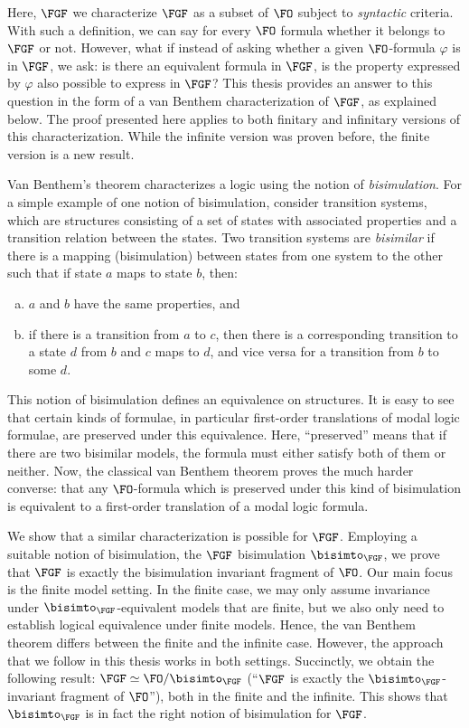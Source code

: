 Here, $\FGF$ we characterize $\FGF$ as a subset of $\FO$ subject to \emph{syntactic} criteria.
With such a definition, we can say for every $\FO$ formula whether it belongs to $\FGF$ or not.
However, what if instead of asking whether a given $\FO$-formula $\varphi$ is in $\FGF$, we ask: is there an equivalent formula in $\FGF$, \ie is the property expressed by $\varphi$ also possible to express in $\FGF$?
This thesis provides an answer to this question in the form of a van Benthem characterization of $\FGF$, as explained below.
The proof presented here applies to both finitary and infinitary versions of this characterization.
While the infinite version was proven before, the finite version is a new result.

Van Benthem's theorem characterizes a logic using the notion of \emph{bisimulation}.
For a simple example of one notion of bisimulation, consider transition systems, which are structures consisting of a set of states with associated properties and a transition relation between the states.
Two transition systems are \emph{bisimilar} if there is a mapping (bisimulation) between states from one system to the other such that if state $a$ maps to state $b$, then:
\begin{enumerate}[(a)]
  \item $a$ and $b$ have the same properties, and
  \item if there is a transition from $a$ to $c$, then there is a corresponding transition to a state $d$ from $b$ and $c$ maps to $d$, and vice versa for a transition from $b$ to some $d$.
\end{enumerate}
This notion of bisimulation defines an equivalence on structures.
It is easy to see that certain kinds of formulae, in particular first-order translations of modal logic formulae, are preserved under this equivalence.
Here, ``preserved'' means that if there are two bisimilar models, the formula must either satisfy both of them or neither.
Now, the classical van Benthem theorem\cite{van1983modal} proves the much harder converse: that any $\FO$-formula which is preserved under this kind of bisimulation is equivalent to a first-order translation of a modal logic formula.

We show that a similar characterization is possible for $\FGF$.
Employing a suitable notion of bisimulation, the $\FGF$ bisimulation $\bisimto_{\FGF}$, we prove that $\FGF$ is exactly the bisimulation invariant fragment of $\FO$.
Our main focus is the finite model setting.
In the finite case, we may only assume invariance under $\bisimto_{\FGF}$-equivalent models that are finite, but we also only need to establish logical equivalence under finite models.
Hence, the van Benthem theorem differs between the finite and the infinite case.
However, the approach that we follow in this thesis works in both settings.
Succinctly, we obtain the following result: $\FGF \simeq \FO/{\bisimto_{\FGF}}$ (``$\FGF$ is exactly the $\bisimto_{\FGF}$-invariant fragment of $\FO$''), both in the finite and the infinite.
This shows that $\bisimto_{\FGF}$ is in fact the right notion of bisimulation for $\FGF$.

